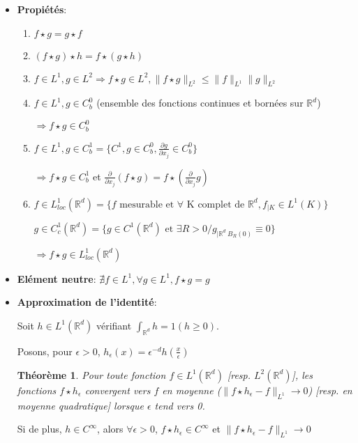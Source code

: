 \documentclass[10pt,a4paper,oneside]{article}
\newtheorem{theoreme}{Théorème}
\begin{document}
\begin{itemize}
\item
\textbf{Propiétés}:

\begin{enumerate}
\item
$f \star g = g \star f$

\item
$(f \star g) \star h = f \star (g \star h)$

\item
$f \in L^1, g \in L^2 \Rightarrow f \star g \in L^2, \| f \star g \|_{L^2} \leq \| f \|_{L^1} \| g \|_{L^2}$

\item
$f \in L^1, g \in C^0_b$ (ensemble des fonctions continues et bornées sur $\mathbb{R}^d$)

$\Rightarrow f \star g \in C^0_b$
\item
$f \in L^1, g \in C^1_b = \{ C^1,g \in C^0_b, \frac{\partial g}{\partial x_j} \in C^0_b \}$

$\Rightarrow f \star g \in C^1_b$ et $\frac{\partial}{\partial x_j}(f \star g) = f \star (\frac{\partial}{\partial x_j} g)$

\item
$f \in L^1_{loc}(\mathbb{R}^d) = \{f \text{ mesurable et } \forall \text{ K complet de } \mathbb{R}^d, f_{|K} \in L^1(K)\}$

$g \in C^1_c(\mathbb{R}^d) = \{ g \in C^1(\mathbb{R}^d) \text{ et } \exists R > 0 / g_{|\mathbb{R}^d \ B_{R}(0)} \equiv 0 \}$

$\Rightarrow f \star g \in L^1_{loc}(\mathbb{R}^d)$
\end{enumerate}

\item
\textbf{Elément neutre}: $\nexists f \in L^1, \forall g \in L^1, f \star g = g$

\item
\textbf{Approximation de l'identité}: 

Soit $h \in L^1(\mathbb{R}^d)$ vérifiant $\int_{\mathbb{R}^d} h = 1 (h \geq 0)$.

Posons, pour $\epsilon > 0$, $h_{\epsilon} (x)  = \epsilon^{-d} h(\frac{x}{\epsilon})$

\begin{theoreme}
Pour toute fonction $f \in L^1(\mathbb{R}^d)$ [resp. $L^2(\mathbb{R}^d)$], les fonctions $f \star h_\epsilon$ convergent vers $f$ en moyenne ($\| f \star h_\epsilon - f \|_{L^1} \to 0$) [resp. en moyenne quadratique] lorsque $\epsilon$ tend vers 0.
\end{theoreme}

Si de plus, $h \in C^{\infty}$, alors $\forall \epsilon > 0$, $f \star h_\epsilon \in C^{\infty}$ et $\| f \star h_\epsilon - f \|_{L^1} \to 0$
\end{itemize}
\end{document}
